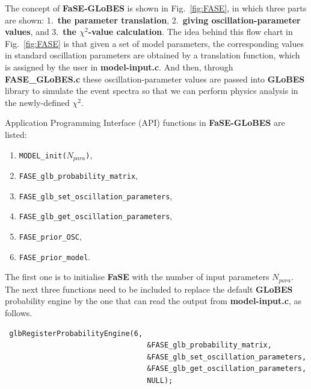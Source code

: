 \documentclass[aps,prd,nofootinbib,preprint]{revtex4}
\begin{document}
The concept of \textbf{FaSE-GLoBES} is shown in Fig.~\ref{fig:FASE}, in which three parts are shown: 1.~\textbf{the parameter translation}, 2.~\textbf{giving oscillation-parameter values}, and 3.~\textbf{the $\chi^2$-value calculation}. 
The idea behind this flow chart in Fig.~\ref{fig:FASE} is that given a set of model parameters, the corresponding values in standard oscillation parameters are obtained by a translation function, which is assigned by the user in \textbf{model-input.c}. And then, through \textbf{FASE\_GLoBES.c} these oscillation-parameter values are passed into \textbf{GLoBES} library to simulate the event spectra so that we can perform physics analysis in the newly-defined $\chi^2$. 


Application Programming Interface (API) functions in \textbf{FaSE-GLoBES} are listed:
\begin{enumerate}
\item \texttt{MODEL\_init($N_{para}$)},
\item  \texttt{FASE\_glb\_probability\_matrix},
\item  \texttt{FASE\_glb\_set\_oscillation\_parameters},
\item  \texttt{FASE\_glb\_get\_oscillation\_parameters},
\item \texttt{FASE\_prior\_OSC},
\item \texttt{FASE\_prior\_model}.
\end{enumerate}
The first one is to initialise \textbf{FaSE} with the number of input parameters $N_{para}$. The next three functions need to be included to replace the default \textbf{GLoBES} probability engine by the one that can read the output from \textbf{model-input.c}, as follows.
\begin{verbatim}
 glbRegisterProbabilityEngine(6,
                                 &FASE_glb_probability_matrix,
                                 &FASE_glb_set_oscillation_parameters,
                                 &FASE_glb_get_oscillation_parameters,
                                 NULL);
\end{verbatim}
\end{document}
